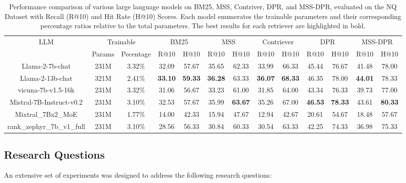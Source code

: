 \documentclass[sigconf,natbib=true,anonymous=false]{acmart}
\begin{document}
\begin{table}[!htbp]
\centering
\begin{tabular}{c|cc|cc|cc|cc|cc|cc}
\toprule
\multirow{2}{*}{ LLM } & \multicolumn{2}{c}{ Trainable } & \multicolumn{2}{c}{ BM25 } & \multicolumn{2}{c}{ MSS } & \multicolumn{2}{c}{ Contriever } & \multicolumn{2}{c}{ DPR } &  \multicolumn{2}{c}{ MSS-DPR } \\
\cmidrule(lr){2-3}\cmidrule(lr){4-5} \cmidrule(lr){6-7} \cmidrule(lr){8-9} \cmidrule(lr){10-11} \cmidrule(lr){12-13}
& Params & Pecentage & R@10 & H@10 & R@10 & H@10 & R@10 & H@10 & R@10 & H@10 & R@10 & H@10\\
\midrule
Llama-2-7b-chat & 231M & 3.32\% & 32.09 & 57.67 & 35.65  & 62.33  & 33.99 & 66.33 & 45.44 & 76.67 & 41.48 & 78.00\\
Llama-2-13b-chat & 321M & 2.41\% & \textbf{33.10} & \textbf{59.33} & \textbf{36.28}  & 63.33  & \textbf{36.07} & \textbf{68.33} & 46.35 & 78.00    & \textbf{44.01} & 78.33 \\
vicuna-7b-v1.5-16k & 231M & 3.32\% & 31.06 & 56.67 & 33.23 & 61.00 & 31.85 & 64.00 & 43.34 & 76.33 & 39.73 & 77.00\\
Mistral-7B-Instruct-v0.2 & 231M & 3.10\% & 32.53 & 57.67 & 35.99 & \textbf{63.67} & 35.26 & 67.00 & \textbf{46.53} & \textbf{78.33} & 43.61 & \textbf{80.33} \\
Mixtral\_7Bx2\_MoE & 231M & 1.77\% & 14.00 & 42.33 & 15.94  & 47.67 & 12.94 & 42.67 & 20.61 & 54.67 & 18.48 & 57.67\\
rank\_zephyr\_7b\_v1\_full & 231M & 3.10\% & 28.56 & 56.33 & 30.84 & 60.33 & 30.54 & 63.33 & 42.25 & 74.33 & 36.98 & 75.33\\
\bottomrule
\end{tabular}
\caption{Performance comparison of various large language models on BM25, MSS, Contriver, DPR, and MSS-DPR, evaluated on the NQ Dataset with Recall (R@10) and Hit Rate (H@10) Scores. Each model enumerates the trainable parameters and their corresponding percentage ratios relative to the total parameters. The best results for each retriever are highlighted in bold.}
\label{tab: llm_comparison}
\end{table}

\subsection{Research Questions}
An extensive set of experiments was designed to address the following research questions:
\end{document}
